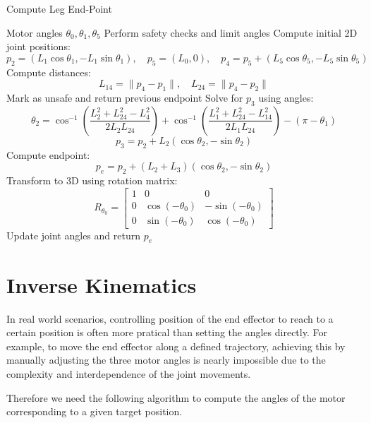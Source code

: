 \documentclass[a4paper,11pt]{article}
\begin{document}
\begin{algorithm}[H]
	\caption{Compute Leg End-Point}
	\begin{algorithmic}[1]
			\Require Motor angles $\theta_0, \theta_1, \theta_5$
			\State Perform safety checks and limit angles
			\State Compute initial 2D joint positions:
			\[
				p_2 = (L_1 \cos \theta_1, -L_1 \sin \theta_1), \quad
				p_5 = (L_0, 0), \quad
				p_4 = p_5 + (L_5 \cos \theta_5, -L_5 \sin \theta_5)
			\]
			\State Compute distances:
			\[
					L_{14} = \| p_4 - p_1 \|, \quad
					L_{24} = \| p_4 - p_2 \|
			\]
					\State Mark as unsafe and return previous endpoint
			\EndIf
			\State Solve for $p_3$ using angles:
			\[
					\theta_2 = \cos^{-1} \left( \frac{L_2^2 + L_{24}^2 - L_4^2}{2 L_2 L_{24}} \right) +
										 \cos^{-1} \left( \frac{L_1^2 + L_{24}^2 - L_{14}^2}{2 L_1 L_{24}} \right) - (\pi - \theta_1)
			\]
			\[
					p_3 = p_2 + L_2 (\cos \theta_2, -\sin \theta_2)
			\]
			\State Compute endpoint:
			\[
					p_e = p_2 + (L_2 + L_3)(\cos \theta_2, -\sin \theta_2)
			\]
			\State Transform to 3D using rotation matrix:
			\[
					R_{\theta_0} =
					\begin{bmatrix}
							1 & 0 & 0 \\
							0 & \cos(-\theta_0) & -\sin(-\theta_0) \\
							0 & \sin(-\theta_0) & \cos(-\theta_0)
					\end{bmatrix}
			\]
			\State Update joint angles and return $p_e$
	\end{algorithmic}
\end{algorithm}

\section*{Inverse Kinematics}

In real world scenarios, controlling position of the end effector to reach to a certain position
is often more pratical than setting the angles directly. For example, to move the end effector along 
a defined trajectory, achieving this by manually adjusting the three motor angles is nearly impossible 
due to the complexity and interdependence of the joint movements. 

Therefore we need the following algorithm 
to compute the angles of the motor corresponding to a given target position.
\end{document}
